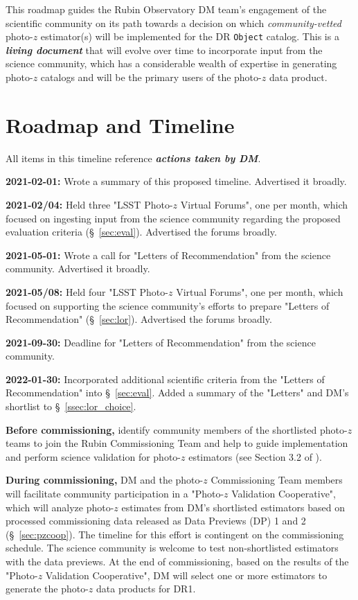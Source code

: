 \documentclass[DM,authoryear,toc]{lsstdoc}
\begin{document}
This roadmap guides the Rubin Observatory DM team's engagement of the scientific community on its path towards a decision on which \textit{community-vetted} photo-$z$ estimator(s) will be implemented for the DR {\tt Object} catalog.
This is a \textit{\textbf{living document}} that will evolve over time to incorporate input from the science community, which has a considerable wealth of expertise in generating photo-$z$ catalogs and will be the primary users of the photo-$z$ data product.


\section{Roadmap and Timeline}\label{sec:time}

All items in this timeline reference \textbf{\textit{actions taken by DM}}.

{\bf 2021-02-01:} Wrote a summary of this proposed timeline. Advertised it broadly.

{\bf 2021-02/04:} Held three "LSST Photo-$z$ Virtual Forums", one per month, which focused on ingesting input from the science community regarding the proposed evaluation criteria (\S~\ref{sec:eval}). Advertised the forums broadly.

{\bf 2021-05-01:} Wrote a call for "Letters of Recommendation" from the science community. Advertised it broadly.

{\bf 2021-05/08:} Held four "LSST Photo-$z$ Virtual Forums", one per month, which focused on supporting the science community's efforts to prepare "Letters of Recommendation" (\S~\ref{sec:lor}). Advertised the forums broadly.

{\bf 2021-09-30:} Deadline for "Letters of Recommendation" from the science community.

{\bf 2022-01-30:} Incorporated additional scientific criteria from the "Letters of Recommendation" into \S~\ref{sec:eval}.
Added a summary of the "Letters" and DM's shortlist to \S~\ref{ssec:lor_choice}.

{\bf Before commissioning,} identify community members of the shortlisted photo-$z$ teams to join the Rubin Commissioning Team and help to guide implementation and perform science validation for photo-$z$ estimators (see Section 3.2 of \cite{sitcomtn-010}).

{\bf During commissioning,} DM and the photo-$z$ Commissioning Team members will facilitate community participation in a "Photo-$z$ Validation Cooperative", which will analyze photo-$z$ estimates from DM's shortlisted estimators based on processed commissioning data released as Data Previews (DP) 1 and 2 (\S~\ref{sec:pzcoop}).
The timeline for this effort is contingent on the commissioning schedule.
The science community is welcome to test non-shortlisted estimators with the data previews.
At the end of commissioning, based on the results of the "Photo-$z$ Validation Cooperative", DM will select one or more estimators to generate the photo-$z$ data products for DR1.
\end{document}
